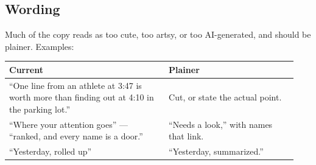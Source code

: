 \documentclass[11pt]{article}
\begin{document}
\subsection{Wording}

Much of the copy reads as too cute, too artsy, or too AI-generated, and should be plainer. Examples:

\begin{center}
\small
\begin{tabular}{@{}p{0.52\linewidth} p{0.42\linewidth}@{}}
\toprule
\textbf{Current} & \textbf{Plainer}\\
\midrule
``One line from an athlete at 3:47 is worth more than finding out at 4:10 in the parking lot.'' & Cut, or state the actual point.\\[4pt]
``Where your attention goes'' --- ``ranked, and every name is a door.'' & ``Needs a look,'' with names that link.\\[4pt]
``Yesterday, rolled up'' & ``Yesterday, summarized.''\\
\bottomrule
\end{tabular}
\end{center}


\end{document}
